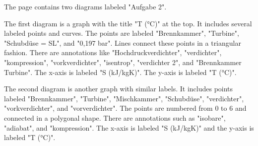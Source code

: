 The page contains two diagrams labeled "Aufgabe 2". 

The first diagram is a graph with the title "T (°C)" at the top. It includes several labeled points and curves. The points are labeled "Brennkammer", "Turbine", "Schubdüse = SL", and "0,197 bar". Lines connect these points in a triangular fashion. There are annotations like "Hochdruckverdichter", "verdichter", "kompression", "vorkverdichter", "isentrop", "verdichter 2", and "Brennkammer Turbine". The x-axis is labeled "S (kJ/kgK)". The y-axis is labeled "T (°C)".

The second diagram is another graph with similar labels. It includes points labeled "Brennkammer", "Turbine", "Mischkammer", "Schubdüse", "verdichter", "vorkverdichter", and "vorverdichter". The points are numbered from 0 to 6 and connected in a polygonal shape. There are annotations such as "isobare", "adiabat", and "kompression". The x-axis is labeled "S (kJ/kgK)" and the y-axis is labeled "T (°C)".